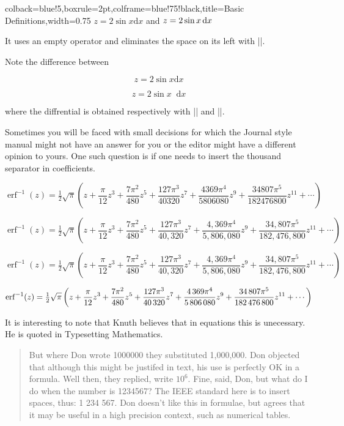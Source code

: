 {\begin{tcblisting}{colback=blue!5,boxrule=2pt,colframe=blue!75!black,title=Basic Definitions,width=0.75\textwidth}
\newcommand{\ud}{\ensuremath \mathop{}\!\mathrm{d}}
\(z=2\sin x\mathrm{d}x\) and \(z=2\sin x\ud x\)
\end{tcblisting}
\newcommand{\ud}{\mathop{}\!\mathrm{d}}
\bigskip

It uses an empty operator and eliminates the space
on its left with |\!|.

Note the difference between

\[z=2\sin x\mathrm{d}x  \]

\[z=2\sin x\ud x\]

where the diffrential is obtained respectively with
|| and |\ud|.


Sometimes you will be faced with small decisions for which the Journal style manual might not have an answer for you or the editor might have a different opinion to yours. One such question is if one needs to insert the thousand separator in coefficients.

\[
\operatorname{erf}^{-1}(z)=\tfrac{1}{2}\sqrt{\pi}\left (z+\frac{\pi}{12}z^3+\frac{7\pi^2}{480}z^5+\frac{127\pi^3}{40320}z^7+\frac{4369\pi^4}{5806080}z^9+\frac{34807\pi^5}{182476800}z^{11}+\cdots\right )
\]


\[
\operatorname{erf}^{-1}(z)=\tfrac{1}{2}\sqrt{\pi}\left (z+\frac{\pi}{12}z^3+\frac{7\pi^2}{480}z^5+\frac{127\pi^3}{40,320}z^7+\frac{4,369\pi^4}{5,806,080}z^9+\frac{34,807\pi^5}{182,476,800}z^{11}+\cdots\right )
\]

\[
\operatorname{erf}^{-1}(z)=\tfrac{1}{2}\sqrt{\pi}\left (z+\frac{\pi}{12}z^3+\frac{7\pi^2}{480}z^5+\frac{127\pi^3}{40{,}320}z^7+\frac{4{,}369\pi^4}{5{,}806{,}080}z^9+\frac{34{,}807\pi^5}{182{,}476,800}z^{11}+\cdots\right )
\]



\[
\operatorname{erf}^{-1}(z)=\tfrac{1}{2}\sqrt{\pi}\left (z+\frac{\pi}{12}z^3+\frac{7\pi^2}{480}z^5+\frac{127\pi^3}{40\thinspace 320}z^7+\frac{4\thinspace 369\pi^4}{5\thinspace 806\thinspace 080}z^9+\frac{34\thinspace 807\pi^5}{182\thinspace 476\thinspace 800}z^{11}+\cdots\right )
\]


It is interesting to note that Knuth believes that in equations this is unecessary.
He is quoted in Typesetting Mathematics.

\begin{quotation}
But where Don wrote 1000000 they substituted
1,000,000. Don objected that although this might be justifed in text, his use is perfectly OK in a formula. Well then, they replied, write \(10^6\).
Fine, said, Don, but what do I do 
when the number is 1234567? The IEEE standard here is to insert spaces, thus: 1 234 567.
Don doesn't like this in formulae, but agrees that it may be useful in a high precision context, such as numerical tables. 
\end{quotation}

}
